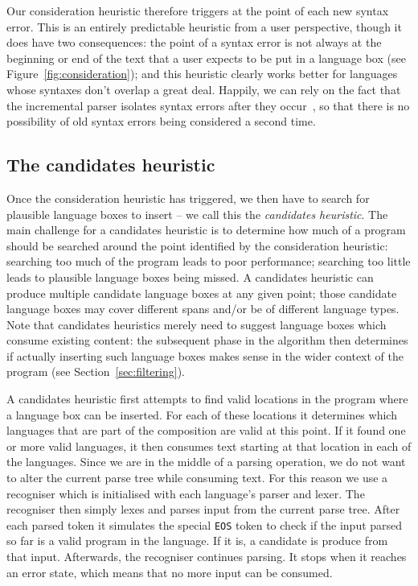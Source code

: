 \documentclass[sigplan,screen]{acmart}\settopmatter{printfolios=true,printccs=false,printacmref=false}
\begin{document}
Our consideration heuristic therefore triggers at the point of each new syntax error.
This is an entirely predictable heuristic from a user perspective, though it
does have two consequences: the point of a syntax error is not always at the
beginning or end of the text that a user expects to be put in a language box
(see Figure~\ref{fig:consideration}); and this heuristic clearly works better
for languages whose syntaxes don't overlap a great deal. Happily, we can rely
on the fact that the incremental parser isolates syntax errors after they
occur~\cite[p.~93]{wagner98practicalalgorithms}, so that there is no
possibility of old syntax errors being considered a second time.


\subsection{The candidates heuristic}

Once the consideration heuristic has triggered, we then have to search for
plausible language boxes to insert -- we call this the \emph{candidates heuristic}. The
main challenge for a candidates heuristic is to determine how much of a program
should be searched around the point identified by the consideration heuristic:
searching too much of the program leads to poor performance; searching too
little leads to plausible language boxes being missed. A candidates heuristic
can produce multiple candidate language boxes at any given point; those
candidate language boxes may cover different spans and/or be of different
language types. Note that candidates heuristics merely need to suggest language
boxes which consume existing content: the subsequent phase in the algorithm
then determines if actually inserting such language boxes makes sense in the
wider context of the program (see Section~\ref{sec:filtering}).

A candidates heuristic first attempts to find valid locations in the program
where a language box can be inserted. For each of these locations it determines
which languages that are part of the composition are valid at this point. If it
found one or more valid languages, it then consumes text starting at that
location in each of the languages. Since we are in the middle of a parsing
operation, we do not want to alter the current parse tree while consuming text.
For this reason we use a recogniser which is initialised with each language's
parser and lexer. The recogniser then simply lexes and parses input from the
current parse tree. After each parsed token it simulates the special
\texttt{EOS} token to check if the input parsed so far is a valid program in
the language. If it is, a candidate is produce from that input. Afterwards, the
recogniser continues parsing. It stops when it reaches an error state, which
means that no more input can be consumed.
\end{document}
